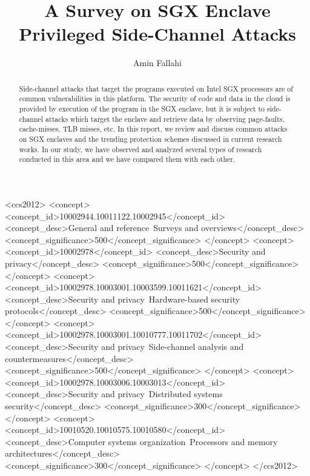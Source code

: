 \documentclass[format=acmsmall, review=false, screen=true]{acmart}
\begin{document}
\title{A Survey on SGX Enclave Privileged Side-Channel Attacks}

\author{Amin Fallahi}

\begin{abstract}
Side-channel attacks that target the programs executed on Intel SGX processors are of common vulnerabilities in this platform. The security of code and data in the cloud is provided by execution of the program in the SGX enclave, but it is subject to side-channel attacks which target the enclave and retrieve data by observing page-faults, cache-misses, TLB misses, etc. In this report, we review and discuss common attacks on SGX enclaves and the trending protection schemes discussed in current research works. In our study, we have observed and analyzed several types of research conducted in this area and we have compared them with each other.%
\end{abstract}


%
%
 \begin{CCSXML}
	<ccs2012>
	<concept>
	<concept_id>10002944.10011122.10002945</concept_id>
	<concept_desc>General and reference~Surveys and overviews</concept_desc>
	<concept_significance>500</concept_significance>
	</concept>
	<concept>
	<concept_id>10002978</concept_id>
	<concept_desc>Security and privacy</concept_desc>
	<concept_significance>500</concept_significance>
	</concept>
	<concept>
	<concept_id>10002978.10003001.10003599.10011621</concept_id>
	<concept_desc>Security and privacy~Hardware-based security protocols</concept_desc>
	<concept_significance>500</concept_significance>
	</concept>
	<concept>
	<concept_id>10002978.10003001.10010777.10011702</concept_id>
	<concept_desc>Security and privacy~Side-channel analysis and countermeasures</concept_desc>
	<concept_significance>500</concept_significance>
	</concept>
	<concept>
	<concept_id>10002978.10003006.10003013</concept_id>
	<concept_desc>Security and privacy~Distributed systems security</concept_desc>
	<concept_significance>300</concept_significance>
	</concept>
	<concept>
	<concept_id>10010520.10010575.10010580</concept_id>
	<concept_desc>Computer systems organization~Processors and memory architectures</concept_desc>
	<concept_significance>300</concept_significance>
	</concept>
	</ccs2012>
\end{CCSXML}
\end{document}

